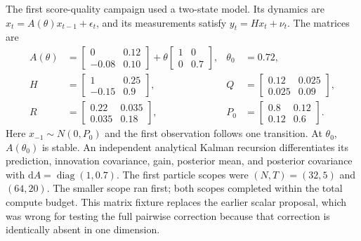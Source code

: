 \documentclass[11pt]{article}
\newcommand{\dd}{\mathrm{d}}
\begin{document}
The first score-quality campaign used a two-state model.  Its dynamics are
$x_t=A(\theta)x_{t-1}+\epsilon_t$, and its measurements satisfy
$y_t=Hx_t+\nu_t$.  The matrices are
\begin{align}
 A(\theta)
 &=
 \begin{bmatrix}0&0.12\\-0.08&0.10\end{bmatrix}
 +\theta\begin{bmatrix}1&0\\0&0.7\end{bmatrix},
 &\theta_0&=0.72,\\
 H&=\begin{bmatrix}1&0.25\\-0.15&0.9\end{bmatrix},
 &Q&=\begin{bmatrix}0.12&0.025\\0.025&0.09\end{bmatrix},\\
 R&=\begin{bmatrix}0.22&0.035\\0.035&0.18\end{bmatrix},
 &P_0&=\begin{bmatrix}0.8&0.12\\0.12&0.6\end{bmatrix}.
 \label{eq:phase4b-matrix-lgssm}
\end{align}
Here $x_{-1}\sim N(0,P_0)$ and the first observation follows one transition.
At $\theta_0$, $A(\theta_0)$ is stable.  An independent analytical Kalman
recursion differentiates its prediction, innovation covariance, gain, posterior
mean, and posterior covariance with $\dd A=\operatorname{diag}(1,0.7)$.  The
first particle scopes were $(N,T)=(32,5)$ and $(64,20)$.  The smaller scope ran
first; both scopes completed within the total compute budget.  This matrix
fixture replaces the earlier scalar proposal,
which was wrong for testing the full pairwise correction because that
correction is identically absent in one dimension.
\end{document}

